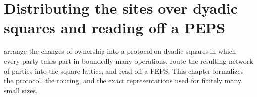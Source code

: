 \chapter{Distributing the sites over dyadic squares and reading off a PEPS}
\label{ch:peps_dyadic_protocol}

\cite[Sections~7 and~8]{OpenAI2026PolynomialPEPS} arrange the changes of
ownership into a protocol on dyadic squares in which every party takes part in
boundedly many operations, route the resulting network of parties into the
square lattice, and read off a PEPS. This chapter formalizes the protocol, the
routing, and the exact representations used for finitely many small sizes.








